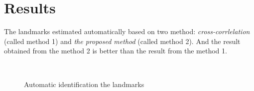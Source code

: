 \section{Results}
The landmarks estimated automatically based on two method: \textit{cross-corrlelation} (called method 1) and \textit{the proposed method} (called method 2). And the result obtained from the method 2 is better than the result from the method 1.
\begin{figure}[h!]
\centering
{}~~
\caption{Automatic identification the landmarks}
\label{fig:figure_31}

\end{figure}